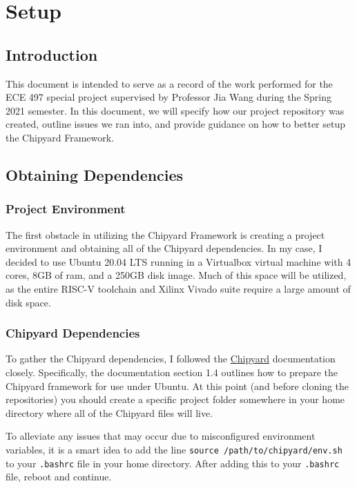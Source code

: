 \chapter{Setup}
\section{Introduction}
This document is intended to serve as a record of the work performed for the ECE 497 special project supervised by Professor Jia Wang during the Spring 2021 semester.
In this document, we will specify how our project repository was created, outline issues we ran into, and provide guidance on how to better setup the Chipyard Framework.

\section{Obtaining Dependencies}

\subsection{Project Environment}
The first obstacle in utilizing the Chipyard Framework is creating a project environment and obtaining all of the Chipyard dependencies.
In my case, I decided to use Ubuntu 20.04 LTS running in a Virtualbox virtual machine with 4 cores, 8GB of ram, and a 250GB disk image.
Much of this space will be utilized, as the entire RISC-V toolchain and Xilinx Vivado suite require a large amount of disk space.

\subsection{Chipyard Dependencies}
To gather the Chipyard dependencies, I followed the \hyperref{https://chipyard.readthedocs.io/en/latest/}{}{}{Chipyard} documentation closely.
Specifically, the documentation section 1.4 outlines how to prepare the Chipyard framework for use under Ubuntu.
At this point (and before cloning the repositories) you should create a specific project folder somewhere in your home directory where all of the Chipyard files will live.

To alleviate any issues that may occur due to misconfigured environment variables, it is a smart idea to add the line \texttt{source /path/to/chipyard/env.sh} to your \texttt{.bashrc} file in your home directory.
After adding this to your \texttt{.bashrc} file, reboot and continue.


